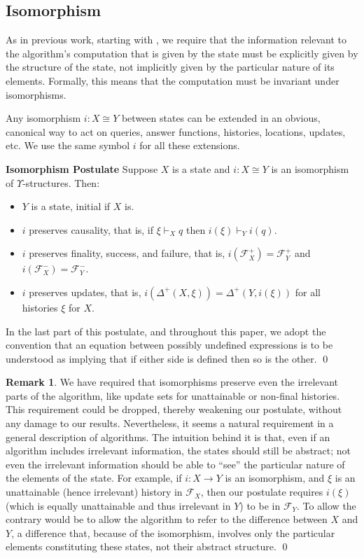 \documentclass{LMCS}
\theoremstyle{definition}
\newtheorem{rmk}[thm]{Remark}
\newenvironment{ls}{\begin{itemize}}{\end{itemize}}
\newenvironment{unn}[1]{\bigskip\noindent\textbf{#1}\quad}{\par\bigskip}
\newcommand{\DD}{\Delta^+}
\newcommand{\scr}[1]{\ensuremath{\mathcal {#1}}}
\begin{document}
\subsection{Isomorphism}

As in previous work, starting with \cite{seqth}, we require that the
information relevant to the algorithm's computation that is given by
the state must be explicitly given by the structure of the state, not
implicitly given by the particular nature of its elements.  Formally,
this means that the computation must be invariant under isomorphisms.

Any isomorphism $i:X\cong Y$ between states can be extended in an
obvious, canonical way to act on queries, answer functions, histories,
locations, updates, etc.  We use the same symbol $i$ for all these
extensions.

\begin{unn}{Isomorphism Postulate}
Suppose $X$ is a state and $i:X\cong Y$ is an isomorphism of
$\Upsilon$-structures.  Then:
\begin{ls}
  \item $Y$ is a state, initial if $X$ is.
  \item $i$ preserves causality, that is, if $\xi\vdash_Xq$ then
  $i(\xi)\vdash_Yi(q)$.
  \item $i$ preserves finality, success, and failure, that is, $i(\scr
  F_X^+)=\scr F_Y^+$ and $i(\scr F_X^-)=\scr F_Y^-$.
  \item $i$ preserves updates, that is, $i(\DD(X,\xi))=\DD(Y,i(\xi))$
  for all histories $\xi$ for $X$.
\end{ls}
\end{unn}

\begin{conv}
  In the last part of this postulate, and throughout this paper, we
  adopt the convention that an equation between possibly undefined
  expressions is to be understood as implying that if either side is
  defined then so is the other.
\qed\end{conv}

\begin{rmk}
  We have required that isomorphisms preserve even the irrelevant
  parts of the algorithm, like update sets for unattainable or
  non-final histories.  This requirement could be dropped, thereby
  weakening our postulate, without any damage to our results.
  Nevertheless, it seems a natural requirement in a general
  description of algorithms.  The intuition behind it is that, even if
  an algorithm includes irrelevant information, the states should
  still be abstract; not even the irrelevant information should be
  able to ``see'' the particular nature of the elements of the state.
  For example, if $i:X\to Y$ is an isomorphism, and $\xi$ is an
  unattainable (hence irrelevant) history in $\scr F_X$, then our
  postulate requires $i(\xi)$ (which is equally unattainable and thus
  irrelevant in $Y$) to be in $\scr F_Y$.  To allow the contrary would
  be to allow the algorithm to refer to the difference between $X$ and
  $Y$, a difference that, because of the isomorphism, involves only the
  particular elements constituting these states, not their abstract
  structure. 
  \qed\end{rmk}
\end{document}
